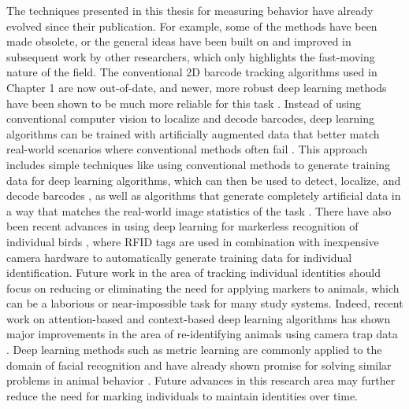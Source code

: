 The techniques presented in this thesis for measuring behavior have already evolved since their publication. For example, some of the methods have been made obsolete, or the general ideas have been built on and improved in subsequent work by other researchers, which only highlights the fast-moving nature of the field. The conventional 2D barcode tracking algorithms used in Chapter 1 are now out-of-date, and newer, more robust deep learning methods have been shown to be much more reliable for this task \citep{wild2018honeybee, boenisch2018tracking, sixt2018rendergan, hu2019deep}. Instead of using conventional computer vision to localize and decode barcodes, deep learning algorithms can be trained with artificially augmented data that better match real-world scenarios where conventional methods often fail \citep{sixt2018rendergan}. This approach includes simple techniques like using conventional methods to generate training data for deep learning algorithms, which can then be used to detect, localize, and decode barcodes \citep{hu2019deep}, as well as algorithms that generate completely artificial data in a way that matches the real-world image statistics of the task \citep{sixt2018rendergan}. There have also been recent advances in using deep learning for markerless recognition of individual birds \citep{ferreira2019deep}, where RFID tags are used in combination with inexpensive camera hardware to automatically generate training data for individual identification. Future work in the area of tracking individual identities should focus on reducing or eliminating the need for applying markers to animals, which can be a laborious or near-impossible task for many study systems. Indeed, recent work on attention-based and context-based deep learning algorithms has shown major improvements in the area of re-identifying animals using camera trap data \citep{beery2020context, norouzzadeh2019deep}. Deep learning methods such as metric learning \citep{koch2015siamese} are commonly applied to the domain of facial recognition and have already shown promise for solving similar problems in animal behavior \citep{bozek2020markerless}. Future advances in this research area may further reduce the need for marking individuals to maintain identities over time.

